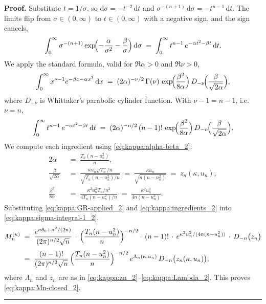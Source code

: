 \documentclass{article}%
\newenvironment{proof}[1][Proof]{\noindent\textbf{#1.} }{\ \rule{0.5em}{0.5em}}
\begin{document}
\begin{proof}
Substitute $t = 1/\sigma$, so $\mathrm{d}\sigma = -t^{-2}\, \mathrm{d}t$
and $\sigma^{-(n+1)}\, \mathrm{d}\sigma = -t^{n-1}\, \mathrm{d}t$.  The
limits flip from $\sigma \in (0, \infty)$ to $t \in (0, \infty)$ with a negative sign, and
the sign cancels,
\begin{equation}
  \int_0^\infty \sigma^{-(n+1)}
  \exp\!\Bigl(-\frac{\alpha}{\sigma^2} - \frac{\beta}{\sigma}\Bigr)\,
  \mathrm{d}\sigma
  \;=\;
  \int_0^\infty t^{n-1}\, e^{-\alpha t^2 - \beta t}\, \mathrm{d}t.
  \label{eq:kappa:sub_2}
\end{equation}
We apply the standard formula, valid for $\Re\alpha > 0$ and $\Re\nu > 0$,
\begin{equation}
  \int_0^\infty x^{\nu - 1} e^{-\beta x - \alpha x^2}\, \mathrm{d}x
  \;=\;
  (2\alpha)^{-\nu/2}\, \Gamma(\nu)\,
  \exp\!\Bigl(\frac{\beta^2}{8\alpha}\Bigr)\,
  D_{-\nu}\!\Bigl(\frac{\beta}{\sqrt{2\alpha}}\Bigr),
  \label{eq:kappa:GR_2}
\end{equation}
where $D_{-\nu}$ is Whittaker's parabolic cylinder function.  With
$\nu - 1 = n - 1$, i.e.\ $\nu = n$,
\begin{equation}
  \int_0^\infty t^{n-1}\, e^{-\alpha t^2 - \beta t}\, \mathrm{d}t
  \;=\;
  (2\alpha)^{-n/2}\, (n-1)!\,
  \exp\!\Bigl(\frac{\beta^2}{8\alpha}\Bigr)\,
  D_{-n}\!\Bigl(\frac{\beta}{\sqrt{2\alpha}}\Bigr).
  \label{eq:kappa:GR-applied_2}
\end{equation}
We compute each ingredient using \eqref{eq:kappa:alpha-beta_2}:
\begin{align}
  2\alpha &\;=\; \frac{T_n(n - u_n^2)}{n},
  \nonumber\\[0.2em]
  \frac{\beta}{\sqrt{2\alpha}}
  &\;=\;
  \frac{\kappa u_n \sqrt{T_n}/n}%
       {\sqrt{T_n(n - u_n^2)/n}}
  \;=\;
  \frac{\kappa u_n}{\sqrt{n(n - u_n^2)}}
  \;=\; z_n(\kappa, u_n),
  \nonumber\\[0.2em]
  \frac{\beta^2}{8\alpha}
  &\;=\;
  \frac{\kappa^2 u_n^2 T_n / n^2}%
       {4 T_n(n - u_n^2)/n}
  \;=\;
  \frac{\kappa^2 u_n^2}{4 n (n - u_n^2)}.
  \label{eq:kappa:ingredients_2}
\end{align}
Substituting \eqref{eq:kappa:GR-applied_2} and
\eqref{eq:kappa:ingredients_2} into
\eqref{eq:kappa:sigma-integral-1_2},
\begin{align*}
  M_n^{(\kappa)}
  &\;=\;
  \frac{e^{\kappa \theta_0 + \kappa^2/(2n)}}{(2\pi)^{n/2}\sqrt n}\,
  \cdot\,
  \Bigl(\frac{T_n(n - u_n^2)}{n}\Bigr)^{-n/2}
  \cdot\, (n-1)!\,
  \cdot\,
  e^{\kappa^2 u_n^2 / (4 n (n - u_n^2))}\,
  \cdot\,
  D_{-n}\bigl(z_n\bigr)
  \\[0.3em]
  &\;=\;
  \frac{(n-1)!}{(2\pi)^{n/2}\sqrt n}\,
  \Bigl(\frac{T_n(n - u_n^2)}{n}\Bigr)^{-n/2}\,
  e^{\Lambda_n(\kappa, u_n)}\,
  D_{-n}\bigl(z_n(\kappa, u_n)\bigr),
\end{align*}
where $\Lambda_n$ and $z_n$ are as in
\eqref{eq:kappa:zn_2}--\eqref{eq:kappa:Lambda_2}.  This proves
\eqref{eq:kappa:Mn-closed_2}.
\end{proof}
\end{document}
